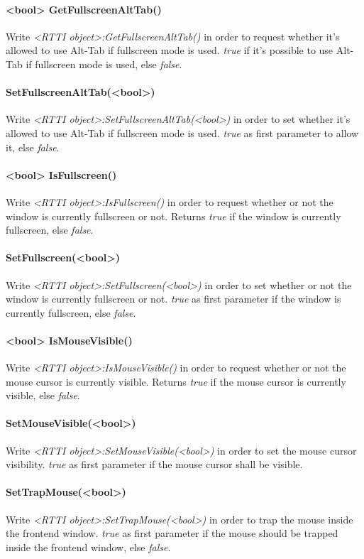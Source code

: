 \paragraph{<bool> GetFullscreenAltTab()}
Write \emph{<RTTI object>:GetFullscreenAltTab()} in order to request whether it's allowed to use Alt-Tab if fullscreen mode is used. \emph{true} if it's possible to use Alt-Tab if fullscreen mode is used, else \emph{false}.

\paragraph{SetFullscreenAltTab(<bool>)}
Write \emph{<RTTI object>:SetFullscreenAltTab(<bool>)} in order to set whether it's allowed to use Alt-Tab if fullscreen mode is used. \emph{true} as first parameter to allow it, else \emph{false}.

\paragraph{<bool> IsFullscreen()}
Write \emph{<RTTI object>:IsFullscreen()} in order to request whether or not the window is currently fullscreen or not. Returns \emph{true} if the window is currently fullscreen, else \emph{false}.

\paragraph{SetFullscreen(<bool>)}
Write \emph{<RTTI object>:SetFullscreen(<bool>)} in order to set whether or not the window is currently fullscreen or not. \emph{true} as first parameter if the window is currently fullscreen, else \emph{false}.

\paragraph{<bool> IsMouseVisible()}
Write \emph{<RTTI object>:IsMouseVisible()} in order to request whether or not the mouse cursor is currently visible. Returns \emph{true} if the mouse cursor is currently visible, else \emph{false}.

\paragraph{SetMouseVisible(<bool>)}
Write \emph{<RTTI object>:SetMouseVisible(<bool>)} in order to set the mouse cursor visibility. \emph{true} as first parameter if the mouse cursor shall be visible.

\paragraph{SetTrapMouse(<bool>)}
Write \emph{<RTTI object>:SetTrapMouse(<bool>)} in order to trap the mouse inside the frontend window. \emph{true} as first parameter if the mouse should be trapped inside the frontend window, else \emph{false}.
